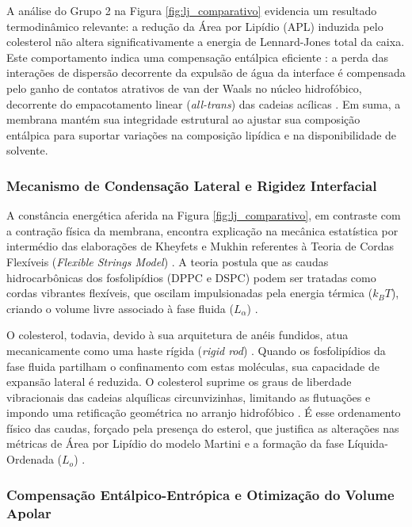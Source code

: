 \documentclass[12pt]{article} %
\begin{document}
A análise do Grupo 2 na Figura \ref{fig:lj_comparativo} evidencia um resultado termodinâmico relevante: a redução da Área por Lipídio (APL) induzida pelo colesterol não altera significativamente a energia de Lennard-Jones total da caixa. Este comportamento indica uma compensação entálpica eficiente \cite{bennett2018}: a perda das interações de dispersão decorrente da expulsão de água da interface é compensada pelo ganho de contatos atrativos de van der Waals no núcleo hidrofóbico, decorrente do empacotamento linear (\textit{all-trans}) das cadeias acílicas \cite{kheyfets2015}. Em suma, a membrana mantém sua integridade estrutural ao ajustar sua composição entálpica para suportar variações na composição lipídica e na disponibilidade de solvente.


\subsubsection*{Mecanismo de Condensação Lateral e Rigidez Interfacial }

A constância energética aferida na Figura \ref{fig:lj_comparativo}, em contraste com a contração física da membrana, encontra explicação na mecânica estatística por intermédio das elaborações de Kheyfets e Mukhin referentes à Teoria de Cordas Flexíveis (\textit{Flexible Strings Model}) \cite{kheyfets2015}. A teoria postula que as caudas hidrocarbônicas dos fosfolipídios (DPPC e DSPC) podem ser tratadas como cordas vibrantes flexíveis, que oscilam impulsionadas pela energia térmica ($k_B T$), criando o volume livre associado à fase fluida ($L_\alpha$) \cite{kheyfets2015}.

O colesterol, todavia, devido à sua arquitetura de anéis fundidos, atua mecanicamente como uma haste rígida (\textit{rigid rod}) \cite{kheyfets2015}. Quando os fosfolipídios da fase fluida partilham o confinamento com estas moléculas, sua capacidade de expansão lateral é reduzida. O colesterol suprime os graus de liberdade vibracionais das cadeias alquílicas circunvizinhas, limitando as flutuações e impondo uma retificação geométrica no arranjo hidrofóbico \cite{bennett2018}. É esse ordenamento físico das caudas, forçado pela presença do esterol, que justifica as alterações nas métricas de Área por Lipídio do modelo Martini e a formação da fase Líquida-Ordenada ($L_o$) \cite{bennett2018}.

\subsubsection*{Compensação Entálpico-Entrópica e Otimização do Volume Apolar}
\end{document}
